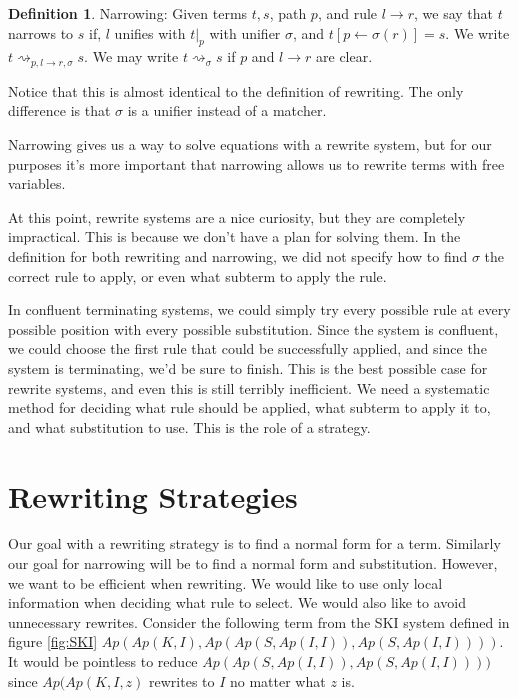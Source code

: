 \documentclass{book}
\theoremstyle{definition}
\newtheorem{definition}{Definition}[section]
\begin{document}
\theoremstyle{definition}
\begin{definition}{Narrowing:}
Given terms $t,s$, path $p$, and rule $l \to r$, we say that $t$ narrows to $s$ if, 
$l$ unifies with $t\vert_p$ with unifier $\sigma$, and $t[p \leftarrow \sigma(r)] = s$.
We write $t \rightsquigarrow_{p,l\to r,\sigma} s$.
We may write $t \rightsquigarrow_\sigma s$ if $p$ and $l \to r$ are clear.
\end{definition}

Notice that this is almost identical to the definition of rewriting.
The only difference is that $\sigma$ is a unifier instead of a matcher.

Narrowing gives us a way to solve equations with a rewrite system,
but for our purposes it's more important that narrowing allows us to
rewrite terms with free variables.

At this point, rewrite systems are a nice curiosity,
but they are completely impractical. 
This is because we don't have a plan for solving them.
In the definition for both rewriting and narrowing,
we did not specify how to find $\sigma$ the correct rule to apply, or even
what subterm to apply the rule.

In confluent terminating systems, we could simply try every possible rule
at every possible position with every possible substitution.
Since the system is confluent, we could choose the first rule that could be successfully applied,
and since the system is terminating, we'd be sure to finish.
This is the best possible case for rewrite systems, 
and even this is still terribly inefficient.
We need a systematic method for deciding what rule should be applied,
what subterm to apply it to,
and what substitution to use.
This is the role of a strategy.

\section{Rewriting Strategies}

Our goal with a rewriting strategy is to find a normal form for a term.
Similarly our goal for narrowing will be to find a normal form and substitution.
However, we want to be efficient when rewriting.
We would like to use only local information when deciding what rule to select.
We would also like to avoid unnecessary rewrites.
Consider the following term from the SKI system defined in figure \ref{fig:SKI}
$Ap(Ap(K, I), Ap(Ap(S,Ap(I,I)),Ap(S,Ap(I,I))))$.
It would be pointless to reduce $Ap(Ap(S,Ap(I,I)),Ap(S,Ap(I,I))))$ since $Ap(Ap(K,I,z)$ rewrites to $I$
no matter what $z$ is.
\end{document}
